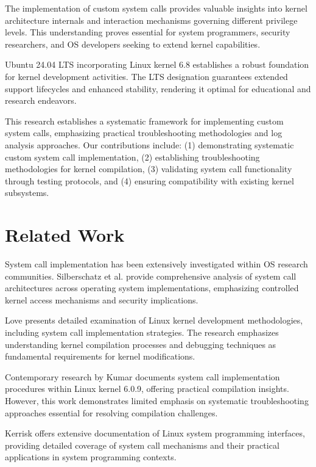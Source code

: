 \documentclass[conference]{IEEEtran}
\begin{document}
The implementation of custom system calls provides valuable insights into kernel architecture internals and interaction mechanisms governing different privilege levels. This understanding proves essential for system programmers, security researchers, and \gls{OS} developers seeking to extend kernel capabilities.

Ubuntu 24.04 \gls{LTS} incorporating Linux kernel 6.8 establishes a robust foundation for kernel development activities. The \gls{LTS} designation guarantees extended support lifecycles and enhanced stability, rendering it optimal for educational and research endeavors.

This research establishes a systematic framework for implementing custom system calls, emphasizing practical troubleshooting methodologies and log analysis approaches. Our contributions include: (1) demonstrating systematic custom system call implementation, (2) establishing troubleshooting methodologies for kernel compilation, (3) validating system call functionality through testing protocols, and (4) ensuring compatibility with existing kernel subsystems.

\section{Related Work}

System call implementation has been extensively investigated within \gls{OS} research communities. Silberschatz et al. \cite{silberschatz2018} provide comprehensive analysis of system call architectures across operating system implementations, emphasizing controlled kernel access mechanisms and security implications.

Love \cite{love2010} presents detailed examination of Linux kernel development methodologies, including system call implementation strategies. The research emphasizes understanding kernel compilation processes and debugging techniques as fundamental requirements for kernel modifications.

Contemporary research by Kumar \cite{kumar2023} documents system call implementation procedures within Linux kernel 6.0.9, offering practical compilation insights. However, this work demonstrates limited emphasis on systematic troubleshooting approaches essential for resolving compilation challenges.

Kerrisk \cite{kerrisk2010} offers extensive documentation of Linux system programming interfaces, providing detailed coverage of system call mechanisms and their practical applications in system programming contexts.
\end{document}
